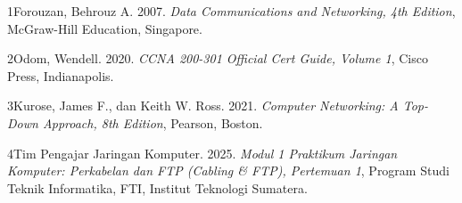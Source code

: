 \newpage
\vspace*{10pt}
\par

\vspace{14pt}

\begin{list}{}{%
  \setlength{\leftmargin}{2.2em}
  \setlength{\itemindent}{-2.2em}
  \setlength{\itemsep}{8pt}
}
  \item[] 1\hspace{1.2em}Forouzan, Behrouz A. 2007. \emph{Data Communications and Networking, 4th Edition}, McGraw-Hill Education, Singapore.
  \item[] 2\hspace{1.2em}Odom, Wendell. 2020. \emph{CCNA 200-301 Official Cert Guide, Volume 1}, Cisco Press, Indianapolis.
  \item[] 3\hspace{1.2em}Kurose, James F., dan Keith W. Ross. 2021. \emph{Computer Networking: A Top-Down Approach, 8th Edition}, Pearson, Boston.
  \item[] 4\hspace{1.2em}Tim Pengajar Jaringan Komputer. 2025. \emph{Modul 1 Praktikum Jaringan Komputer: Perkabelan dan FTP (Cabling \& FTP), Pertemuan 1}, Program Studi Teknik Informatika, FTI, Institut Teknologi Sumatera.
\end{list}

\vspace{14pt}